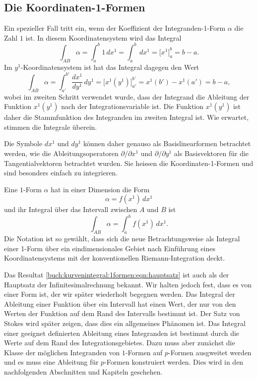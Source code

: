 \subsection{Die Koordinaten-1-Formen}
Ein spezieller Fall tritt ein, wenn der Koeffizient der Integranden-1-Form
$\alpha$ die Zahl $1$ ist.
In diesem Koordinatensystem wird das Integral
\[
\int_{AB} \alpha
=
\int_{a}^{b} 1\, dx^1
=
\int_{a}^b\,dx^1
=
\bigl[ x^1 \bigr]_a^b
=
b-a.
\]
Im $y^1$-Koordinatensystem ist hat das Integral dagegen den Wert
\begin{equation}
\int_{AB}\alpha
=
\int_{a'}^{b'} \frac{dx^1}{dy^1}\,dy^1
=
\bigl[x^1(y^1)\bigr]_{a'}^{b'}
=
x^1(b') - x^1(a')
=
b-a,
\label{buch:kurvenintegral:1formen:eqn:hauptsatz}
\end{equation}
wobei im zweiten Schritt verwendet wurde, dass der Integrand die
Ableitung der Funktion $x^1(y^1)$ nach der Integrationsvariable ist.
Die Funktion $x^1(y^1)$ ist daher die
Stammfunktion des Integranden im zweiten Integral ist.
%
Wie erwartet, stimmen die Integrale überein.

Die Symbole $dx^1$ und $dy^1$ können daher genauso als Basislinearformen
betrachtet werden, wie die Ableitungsoperatoren
$\partial/\partial x^1$ und $\partial/\partial y^1$ als
Basisvektoren für die Tangentialvektoren betrachtet wurden.
Sie heissen die Koordinaten-1-Formen und sind besonders einfach
zu integrieren.

Eine $1$-Form $\alpha$ hat in einer Dimension die Form
\[
\alpha
=
f(x^1) \,dx^1
\]
und ihr Integral über das Intervall zwischen $A$ und $B$ ist
\[
\int_{AB}\alpha
=
\int_a^b f(x^1)\,dx^1.
\]
Die Notation ist so gewählt, dass sich die neue Betrachtungsweise als
Integral einer 1-Form über ein eindimensionales Gebiet nach Einführung
eines Koordinatensystems mit der konventionellen Riemann-Integration
deckt.

Das Resultat
\eqref{buch:kurvenintegral:1formen:eqn:hauptsatz}
ist auch als der Hauptsatz der Infinitesimalrechnung bekannt.
Wir halten jedoch fest, dass es von einer Form ist, der wir später
wiederholt begegnen werden.
Das Integral der Ableitung einer Funktion über ein Intervall hat einen
Wert, der nur von den Werten der Funktion auf dem Rand des Intervalls
bestimmt ist.
Der Satz von Stokes wird später zeigen, dass dies ein allgemeines
Phänomen ist.
Das Integral einer geeignet definierten Ableitung eines Integranden
ist bestimmt durch die Werte auf dem Rand des Integrationsgebietes.
Dazu muss aber zunächst die Klasse der möglichen Integranden von
$1$-Formen auf $p$-Formen ausgweitet werden und es muss eine Ableitung
für $p$-Formen konstruiert werden.
Dies wird in den nachfolgenden Abschnitten und Kapiteln geschehen.

